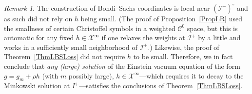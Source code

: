 \documentclass[reqno,11pt,letterpaper]{amsart}
\numberwithin{equation}{section}
\numberwithin{figure}{section}
\theoremstyle{definition}
\theoremstyle{remark}
\newtheorem{rmk}[thm]{Remark}
\newcommand{\mc}{\mathcal}
\newcommand{\cC}{\mc C}
\newcommand{\cX}{\mc X}
\newcommand{\ms}{\mathscr}
\newcommand{\scri}{\ms I}
\begin{document}
\begin{rmk}
  The construction of Bondi--Sachs coordinates is local near $(\scri^+)^\circ$ and as such did not rely on $h$ being small. (The proof of Proposition~\ref{PropLR} used the smallness of certain Christoffel symbols in a weighted $\cC^0$ space, but this is automatic for any fixed $h\in\cX^\infty$ if one relaxes the weights at $\scri^+$ by a little and works in a sufficiently small neighborhood of $\scri^+$.) Likewise, the proof of Theorem~\ref{ThmLBSLoss} did not require $h$ to be small. Therefore, we in fact conclude that \emph{any (large) solution} of the Einstein vacuum equation of the form $g=g_m+\rho h$ (with $m$ possibly large), $h\in\cX^\infty$---which requires it to decay to the Minkowski solution at $I^+$---satisfies the conclusions of Theorem~\ref{ThmLBSLoss}.
\end{rmk}
\end{document}
